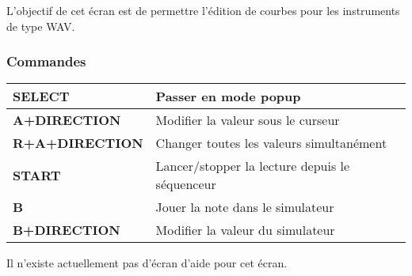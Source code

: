 \label{subsec:customwave}

L'objectif de cet écran est de permettre l'édition de courbes pour les instruments de type WAV.



\subsubsection{Commandes}
\tablelasttail{\hline}
\begin{supertabular}{|l|p{11cm}|}
    \hline
    {\bf SELECT} & Passer en mode popup \\
    \hline
    {\bf A+DIRECTION} & Modifier la valeur sous le curseur \\
    \hline
    {\bf R+A+DIRECTION} & Changer toutes les valeurs simultanément \\
    \hline
    {\bf START} & Lancer/stopper la lecture depuis le séquenceur \\
    \hline
    {\bf B} & Jouer la note dans le simulateur \\
    \hline
    {\bf B+DIRECTION} & Modifier la valeur du simulateur \\
\end{supertabular} \medskip

Il n'existe actuellement pas d'écran d'aide pour cet écran.
